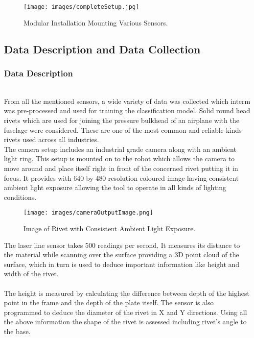\documentclass{article}
\begin{document}
\begin{figure}[H]
        \centering
        \texttt{[image: images/completeSetup.jpg]}
        \caption{Modular Installation Mounting Various Sensors. }
         \label{fig:ModularSensorMounting}
        \end{figure}


\subsection{Data Description and Data Collection} 

\subsubsection{Data Description}\\
From all the mentioned sensors, a wide variety of data was collected which interm was pre-processed and used for training the classification model.
Solid round head  rivets which are used for joining the pressure  bulkhead of an airplane with the fuselage were considered. These are one of the most common and reliable kinds rivets used across all industries. \\

The camera setup includes an industrial grade camera along with an ambient light ring. This setup is mounted on to the robot which allows the camera to move around and place itself right in front of the concerned rivet putting it in focus. 
It provides with 640 by 480 resolution coloured image having consistent ambient light exposure allowing the tool to operate in all kinds of lighting conditions.\\

\begin{figure}[H]
        \centering
        \texttt{[image: images/cameraOutputImage.png]}
        \caption{Image of Rivet with Consistent Ambient Light Exposure. }
         \label{fig:cameraOutputImage}
        \end{figure}


The laser line sensor takes 500 readings per second, It measures its distance to the material while scanning over the surface providing a 3D point cloud of the surface, which in turn is used to deduce important information like height and width of the rivet.\\\\
The height is measured by calculating the difference between depth of the highest point in the frame and the depth of the plate itself. The sensor is also programmed to deduce the diameter of the rivet in X and Y directions. Using all the above information the shape of the rivet is assessed including rivet's angle to the base.\\
\end{document}
